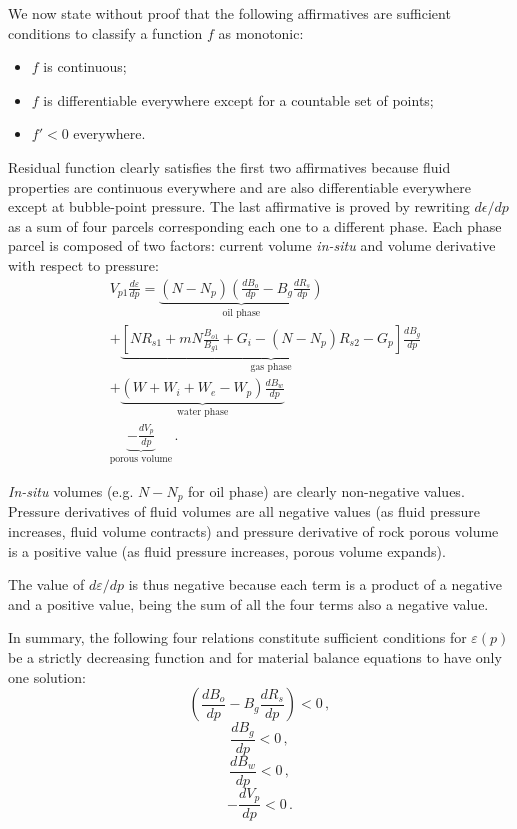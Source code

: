 \documentclass[authoryear,preprint,review,12pt]{elsarticle}
\begin{document}
We now state without proof that the following affirmatives are sufficient conditions to classify a function $f$ as monotonic:
\begin{itemize}
\item $f$ is continuous;
\item $f$ is differentiable everywhere except for a countable set of points;
\item $f'<0$ everywhere.
\end{itemize}

Residual function clearly satisfies the first two affirmatives because fluid properties are continuous everywhere and are also differentiable everywhere except at bubble-point pressure.
The last affirmative is proved by rewriting $d\epsilon/dp$ as a sum of four parcels corresponding each one to a different phase. Each phase parcel is composed of two factors: current volume \textit{in-situ} and volume derivative with respect to pressure:
\begin{equation}
\begin{split}
&V_{p1}\frac{d\varepsilon}{dp}=\underbrace{\left(N-N_p\right) \left(\frac{dB_o}{dp} - B_g \frac{dR_s}{dp} \right)}_\text{oil phase}\\
&+\underbrace{\left[N R_{s1}+mN\frac{B_{o1}}{B_{g1}}+G_i-\left(N-N_p\right)R_{s2}-G_p\right] \frac{dB_g}{dp}}_\text{gas phase}\\
&+\underbrace{\left(W + W_i+W_e-W_p\right)\frac{dB_w}{dp}}_\text{water phase}\\
&\underbrace{-\frac{dV_p}{dp}}_\text{porous volume}\, .
\end{split}
\end{equation}

\textit{In-situ} volumes (e.g. $N-N_p$ for oil phase) are clearly non-negative values. Pressure derivatives of fluid volumes are all negative values (as fluid pressure increases, fluid volume contracts) and pressure derivative of rock porous volume is a positive value (as fluid pressure increases, porous volume expands).

The value of $d\varepsilon/dp$ is thus negative because each term is a product of a negative and a positive value, being the sum of all the four terms also a negative value.

In summary, the following four relations constitute sufficient conditions for $\varepsilon(p)$ be a strictly decreasing function and for material balance equations to have only one solution:
\begin{equation}\label{eq: PVTH1}
\left(\frac{dB_o}{dp} - B_g \frac{dR_s}{dp} \right) <0 \, ,
\end{equation}
\begin{equation}\label{eq: PVTH2}
\frac{dB_g}{dp} < 0 \, ,
\end{equation}
\begin{equation}\label{eq: PVTH3}
\frac{dB_w}{dp} < 0 \, ,
\end{equation}
\begin{equation}\label{eq: PVTH4}
-\frac{dV_p}{dp}<0 \, .
\end{equation}
\end{document}
